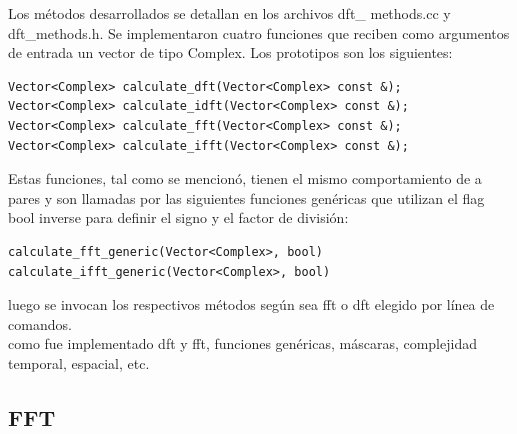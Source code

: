 \documentclass{article}
\begin{document}
Los métodos desarrollados se detallan en los archivos 
dft\_ methods.cc y dft\_methods.h. Se implementaron cuatro funciones que reciben como argumentos de entrada un vector de tipo Complex. Los prototipos son los siguientes:\\
\begin{verbatim}
Vector<Complex> calculate_dft(Vector<Complex> const &);
Vector<Complex> calculate_idft(Vector<Complex> const &);
Vector<Complex> calculate_fft(Vector<Complex> const &);
Vector<Complex> calculate_ifft(Vector<Complex> const &);
\end{verbatim}
Estas funciones, tal como se mencionó, tienen el mismo comportamiento de a pares y son llamadas por las siguientes funciones genéricas que utilizan el flag bool inverse para definir el signo y el factor de división:\\
\begin{verbatim}
calculate_fft_generic(Vector<Complex>, bool)
calculate_ifft_generic(Vector<Complex>, bool)
\end{verbatim}
luego se invocan los respectivos métodos según sea fft o dft elegido por línea de comandos.\\


como fue implementado dft y fft, funciones genéricas, máscaras, complejidad temporal, espacial, etc.
  \subsection{FFT}
\end{document}
